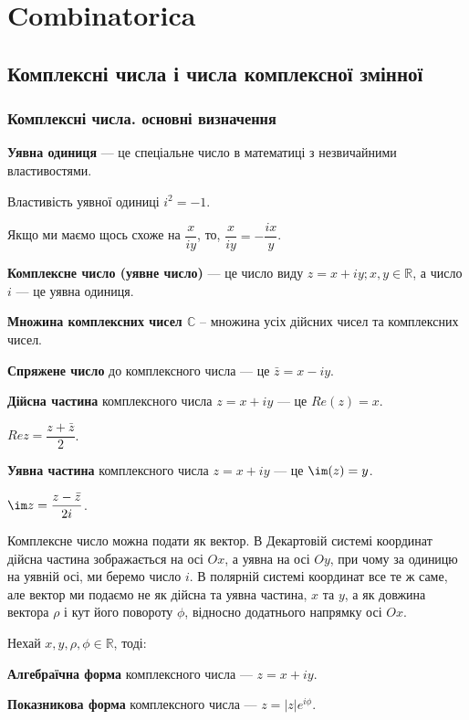 \chapter{Combinatorica}

\section{Комплексні числа і числа комплексної змінної}

\subsection{Комплексні числа. основні визначення}

\textbf{Уявна одиниця} --- це спеціальне число в математиці з незвичайними властивостями.

Властивість уявної одиниці $i^2 = -1$.

Якщо ми маємо щось схоже на $\dfrac{x}{iy}$, то, $\dfrac{x}{iy} = - \dfrac{ix}{y}$.

\textbf{Комплексне число (уявне число)} --- це число виду $z = x + iy; x, y \in \mathbb{R}$,
а число $i$ --- це уявна одиниця.

\textbf{Множина комплексних чисел $\mathbb{C}$} -- множина усіх дійсних чисел та комплексних чисел.

\textbf{Спряжене число} до комплексного числа --- це $\bar z = x - iy$.

\textbf{Дійсна частина} комплексного числа $z = x + iy$ --- це $Re(z) = x$.

$Re z = \dfrac{z + \bar{z}}{2}$.

\textbf{Уявна частина} комплексного числа $z = x + iy$ --- це $\im(z) = y$.

$\im z = \dfrac{z - \bar{z}}{2i}$.

Комплексне число можна подати як вектор.
В Декартовій системі координат дійсна частина зображається на осі $Ox$, а уявна на осі $Oy$, при чому за одиницю на уявній осі, ми беремо число $i$.
В полярній системі координат все те ж саме, але вектор ми подаємо не як дійсна  та уявна частина, $x$ та $y$, а як довжина вектора $\rho$ і кут його повороту $\phi$, відносно додатнього напрямку осі $Ox$.

Нехай $x, y, \rho, \phi \in \mathbb{R}$, тоді:

\textbf{Алгебраїчна форма} комплексного числа --- $z = x + iy$.

\textbf{Показникова форма} комплексного числа --- $z = |z|e^{i \phi}$.

